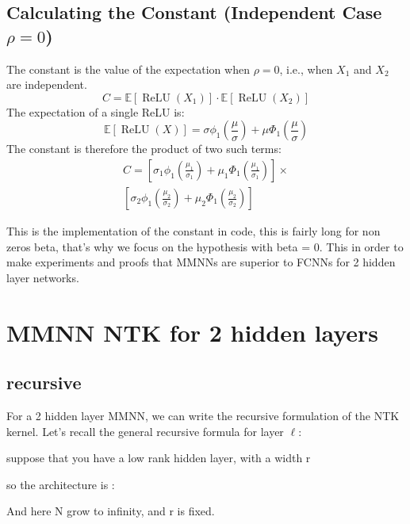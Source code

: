 \documentclass[11pt, a4paper]{article}
\newcommand{\E}{\mathbb{E}}
\DeclareMathOperator{\ReLU}{ReLU}
\begin{document}
\subsection{Calculating the Constant (Independent Case $\rho=0$)}
The constant is the value of the expectation when $\rho=0$, i.e., when $X_1$ and $X_2$ are independent.
\[
C = \E[\ReLU(X_1)] \cdot \E[\ReLU(X_2)]
\]
The expectation of a single ReLU is:
\[
\E[\ReLU(X)] = \sigma\phi_1\left(\frac{\mu}{\sigma}\right) + \mu\Phi_1\left(\frac{\mu}{\sigma}\right)
\]
The constant is therefore the product of two such terms:
\begin{multline*}
C = \left[ \sigma_1\phi_1\left(\frac{\mu_1}{\sigma_1}\right) + \mu_1\Phi_1\left(\frac{\mu_1}{\sigma_1}\right) \right] \times \\ \left[ \sigma_2\phi_1\left(\frac{\mu_2}{\sigma_2}\right) + \mu_2\Phi_1\left(\frac{\mu_2}{\sigma_2}\right) \right]
\end{multline*}

This is the implementation of the constant in code, this is fairly long for non zeros beta, that's why we focus on the hypothesis with beta = 0.
This in order to make experiments and proofs that MMNNs are superior to FCNNs for 2 hidden layer networks.


\newpage

\section{MMNN NTK for 2 hidden layers}
\subsection{recursive}
For a 2 hidden layer MMNN, we can write the recursive formulation of the NTK kernel. Let's recall the general recursive formula for layer $\ell$:

suppose that you have a low rank hidden layer, with a width r


so the architecture is :
\begin{center}
\end{center}
And here N grow to infinity, and r is fixed.
\end{document}
